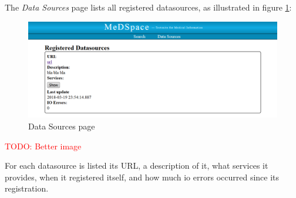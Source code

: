 The \emph{Data Sources} page lists all registered datasources, as illustrated in figure \ref{MeDSpaceDataSourcePage}: 

\begin{figure}[H]
	\begin{center}
		\includegraphics[width=1\textwidth]{figures/MeDSpace-GUI-Datasources.png}
	\end{center}
	\caption{Data Sources page}
	\label{MeDSpaceDataSourcePage}
\end{figure}

\textcolor{red}{TODO: Better image}

For each datasource is listed its URL, a description of it, what services it provides, when it registered itself, and how much io errors occurred since its registration.